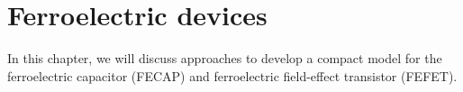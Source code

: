 \chapter{Ferroelectric devices}

In this chapter, we will discuss approaches to develop a compact model for the ferroelectric capacitor (FECAP) and ferroelectric field-effect transistor (FEFET).



